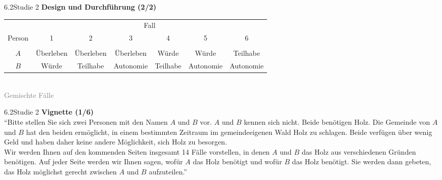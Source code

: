 \documentclass[xcolor=table,9pt,aspectratio=169]{beamer}
\begin{document}
\begin{frame}{\vspace*{10mm}6.2\hspace*{1em}Studie 2}
\textbf{Design und Durchführung (2/2)}\\
\medskip
\begin{center}
   \begin{tabular}{ccccccc}
      \arrayrulecolor{blue2}
      \hline
               & \multicolumn{6}{c}{Fall}                                                         \\
      Person   & 1           & 2           & 3           & 4          & 5           & 6           \\
      \hline\hline\\[-0.5em]
      $A$      & Überleben   & Überleben   & Überleben   & Würde      & Würde       & Teilhabe    \\
      $B$      & Würde       & Teilhabe    & Autonomie   & Teilhabe   & Autonomie   & Autonomie   \\
      \hline
   \end{tabular}\\
   \smallskip
   \textcolor{gray}{Gemischte Fälle}
\end{center}
\end{frame}


\begin{frame}{\vspace*{10mm}6.2\hspace*{1em}Studie 2}
\textbf{Vignette (1/6)}\\
\medskip
\enquote{Bitte stellen Sie sich zwei Personen mit den Namen $A$ und $B$ vor. $A$ und $B$ kennen sich nicht. Beide benötigen Holz. Die Gemeinde von $A$ und $B$ hat den beiden ermöglicht, in einem bestimmten Zeitraum im gemeindeeigenen Wald Holz zu schlagen. Beide verfügen über wenig Geld und haben daher keine andere Möglichkeit, sich Holz zu besorgen.\\
\medskip
Wir werden Ihnen auf den kommenden Seiten insgesamt 14 Fälle vorstellen, in denen $A$ und $B$ das Holz aus verschiedenen Gründen benötigen. Auf jeder Seite werden wir Ihnen sagen, wofür $A$ das Holz benötigt und wofür $B$ das Holz benötigt. Sie werden dann gebeten, das Holz möglichst gerecht zwischen $A$ und $B$ aufzuteilen.}
\end{frame}
\end{document}
